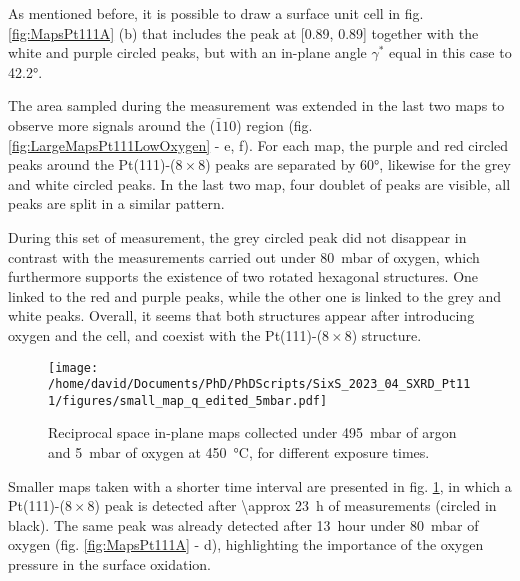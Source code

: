 As mentioned before, it is possible to draw a surface unit cell in fig. \ref{fig:MapsPt111A} (b) that includes the peak at [0.89, 0.89] together with the white and purple circled peaks, but with an in-plane angle $\gamma^*$ equal in this case to \ang{42.2}.

The area sampled during the measurement was extended in the last two maps to observe more signals around the ($\bar{1}10$) region (fig. \ref{fig:LargeMapsPt111LowOxygen} - e, f).
For each map, the purple and red circled peaks around the Pt(111)-($8\times8$) peaks are separated by \ang{60}, likewise for the grey and white circled peaks.
In the last two map, four doublet of peaks are visible, all peaks are split in a similar pattern.

During this set of measurement, the grey circled peak did not disappear in contrast with the measurements carried out under \qty{80}{\milli\bar} of oxygen, which furthermore supports the existence of two rotated hexagonal structures.
One linked to the red and purple peaks, while the other one is linked to the grey and white peaks.
Overall, it seems that both structures appear after introducing oxygen and the cell, and coexist with the Pt(111)-($8\times8$) structure.

\begin{figure}[!htb]
    \centering
    \texttt{[image: /home/david/Documents/PhD/PhDScripts/SixS\_2023\_04\_SXRD\_Pt111/figures/small\_map\_q\_edited\_5mbar.pdf]}
    \caption{
        Reciprocal space in-plane maps collected under \qty{495}{\milli\bar} of argon and \qty{5}{\milli\bar} of oxygen at \qty{450}{\degreeCelsius}, for different exposure times.
    }
    \label{fig:SmallMapsPt111LowOxygen}
\end{figure}

Smaller maps taken with a shorter time interval are presented in fig. \ref{fig:SmallMapsPt111LowOxygen}, in which a Pt(111)-($8\times8$) peak is detected after \qty{\approx 23}{\hour} of measurements (circled in black).
The same peak was already detected after \qty{13}{hour} under \qty{80}{\milli\bar} of oxygen (fig. \ref{fig:MapsPt111A} - d), highlighting the importance of the oxygen pressure in the surface oxidation.

